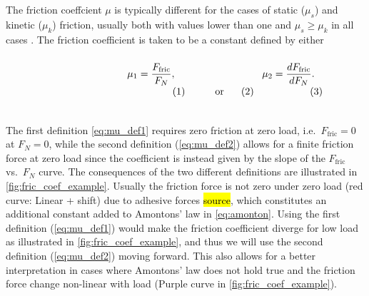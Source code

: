 The friction coeffcient $\mu$ is typically different for the cases of static
($\mu_s$) and kinetic ($\mu_k$) friction, usually both with values lower than
one and $\mu_s \ge \mu_k$ in all cases \cite[p. 6]{gnecco_meyer_2015}. The
friction coefficient is taken to be a constant defined by either
\cite{gao_frictional_2004} \\
\vspace{0.1cm}
\begin{subequations}
\noindent\begin{minipage}{.2\linewidth}
  \hfill
\end{minipage}
\begin{minipage}[b]{0.2\linewidth}
  \begin{align}
    \mu_1 = \frac{F_{\text{fric}}}{F_N},
    \label{eq:mu_def1}
  \end{align}
\end{minipage}
\begin{minipage}[b]{0.2\linewidth}
  \begin{align*}
    \text{or}
  \end{align*}
\end{minipage}
\begin{minipage}[b]{0.2\linewidth}
  \begin{align}
    \mu_2 = \frac{dF_{\text{fric}}}{dF_N}.
    \label{eq:mu_def2}
  \end{align}
\end{minipage}
\begin{minipage}{.2\linewidth}
\end{minipage}
\label{eq:mu_def}
\end{subequations}
\vspace{0.1cm}
\\
\noindent The first definition \cref{eq:mu_def1} requires zero friction at zero
load, i.e.\ $F_{\text{fric}} = 0$ at $F_N = 0$, while the second definition
(\cref{eq:mu_def2}) allows for a finite friction force at zero load since the
coefficient is instead given by the slope of the $F_{\text{fric}}$ vs.\ $F_N$
curve. The consequences of the two different definitions are illustrated in
\cref{fig:fric_coef_example}. Usually the friction force is not zero under
zero load (red curve: Linear + shift) due to adhesive forces \hl{source}, which
constitutes an additional constant added to Amontons’ law in \cref{eq:amonton}. Using the first definition (\cref{eq:mu_def1}) would make the friction coefficient diverge for low load as illustrated in \cref{fig:fric_coef_example}, and thus we will use the second definition (\cref{eq:mu_def2}) moving forward. This also allows for a better interpretation in cases where Amontons’ law does not hold true and the friction force change non-linear with load (Purple curve in \cref{fig:fric_coef_example}).

